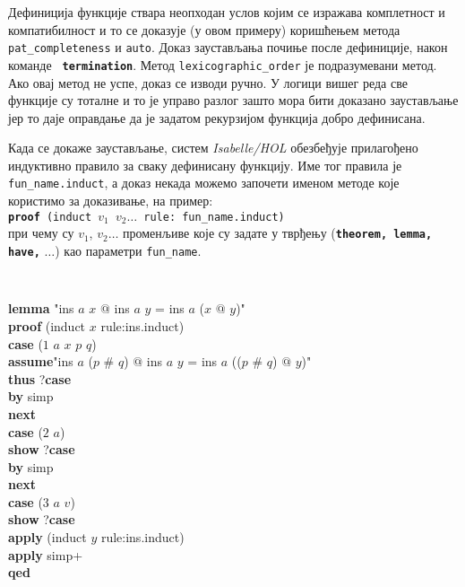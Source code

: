 Дефиниција функције ствара неопходан услов којим се изражава
комплетност и компатибилност и то се доказује (у овом примеру)
коришћењем метода {\tt pat\_completeness} и {\tt auto}. Доказ
заустављања почиње после дефиниције, након команде {\tt
  \textbf{termination}}. Метод {\tt lexicographic\_order} је
подразумевани метод. Ако овај метод не успе, доказ се изводи ручно. У
логици вишег реда све функције су тоталне и то је управо разлог зашто
мора бити доказано заустављање јер то даје оправдање да је задатом
рекурзијом функција добро дефинисана.

Када се докаже заустављање, систем \emph{Isabelle/HOL} обезбеђује
прилагођено индуктивно правило за сваку дефинисану функцију. Име тог
правила је \mbox{{\tt fun\_name.induct}}, а доказ некада можемо
започети именом методе које користимо за доказивање, на пример:
\\ {\tt \textbf{proof} (induct $v_1$ $v_2 \ldots$ rule:
  fun\_name.induct)} \\ при чему су $v_1$, $v_2 \ldots$ променљиве
које су задате у тврђењу ({\tt \textbf{theorem, lemma, have,}}
$\ldots$) као параметри {\tt fun\_name}.

\smallskip
{}
\begin{small}
{\tt 
\begin{tabbing}
\textbf{lem}\=\textbf{ma} "ins $a$ $x$ $@$ ins $a$ $y$ = ins $a$ ($x$ $@$ $y$)" \\
\textbf{proof} (induct $x$ rule:ins.induct) \\
\> \textbf{case} ($1$ $a$ $x$ $p$ $q$) \\
\> \textbf{assume}"ins $a$ ($p$ \# $q$) $@$ ins $a$ $y$ = ins $a$ (($p$ \# $q$) $@$ $y$)" \\
\> \textbf{th}\=\textbf{us} ?\textbf{case} \\
\>\>  \textbf{by} simp \\
\textbf{next} \\
\>  \textbf{case} ($2$ $a$) \\
\>  \textbf{show} ?\textbf{case} \\
\>\>  \textbf{by} simp \\
\textbf{next} \\
\>  \textbf{case} ($3$ $a$ $v$) \\
\>  \textbf{show} ?\textbf{case} \\
\>\> \textbf{apply} (induct $y$ rule:ins.induct) \\
\>\> \textbf{apply} simp+ \\
\textbf{qed}
\end{tabbing}
}
\end{small}

